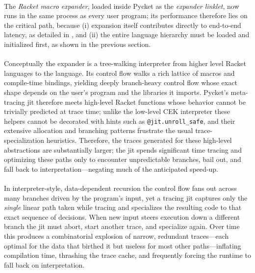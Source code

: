 

		\paragraph{}%
			The \emph{Racket macro expander}, loaded inside Pycket as the \emph{expander linklet}, now runs in the same process as every user program; its performance therefore lies on the critical path, because (i) expansion itself contributes directly to end-to-end latency, as detailed in , and (ii) the entire language hierarchy must be loaded and initialized first, as shown in the previous section.

		\paragraph{}%
			Conceptually the expander is a tree-walking interpreter from higher level Racket languages to the  language. Its control flow walks a rich lattice of macros and compile-time bindings, yielding deeply branch-heavy control flow whose exact shape depends on the user's program and the libraries it imports. Pycket's meta-tracing \gls{jit} therefore meets high-level Racket functions whose behavior cannot be trivially predicted at trace time; unlike the low-level CEK interpreter these helpers cannot be decorated with hints such as \texttt{@jit.unroll\_safe}, and their extensive allocation and branching patterns frustrate the usual trace-specialization heuristics. Therefore, the traces generated for these high-level abstractions are substantially larger; the \gls{jit} spends significant time tracing and optimizing these paths only to encounter unpredictable branches, bail out, and fall back to interpretation—negating much of the anticipated speed-up.

		\paragraph{}%
			In interpreter-style, data-dependent recursion the control flow fans out across many branches driven by the program's input, yet a tracing \gls{jit} captures only the \emph{single} linear path taken while tracing and specializes the resulting code to that exact sequence of decisions. When new input steers execution down a different branch the \gls{jit} must abort, start another trace, and specialize again. Over time this produces a combinatorial explosion of narrow, redundant traces—each optimal for the data that birthed it but useless for most other paths—inflating compilation time, thrashing the trace cache, and frequently forcing the runtime to fall back on interpretation.

